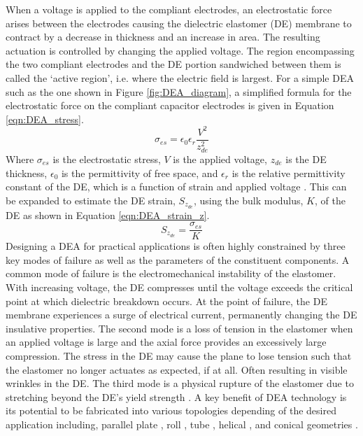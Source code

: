 When a voltage is applied to the compliant electrodes, an electrostatic force arises between the electrodes causing the dielectric elastomer (DE) membrane to contract by a decrease in thickness and an increase in area. The resulting actuation is controlled by changing the applied voltage. The region encompassing the two compliant electrodes and the DE portion sandwiched between them is called the `active region', i.e. where the electric field is largest. For a simple DEA such as the one shown in Figure \ref{fig:DEA_diagram}, a simplified formula for the electrostatic force on the compliant capacitor electrodes is given in Equation \ref{eqn:DEA_stress}.
\begin{equation}
	\sigma_{es} = \epsilon_0 \epsilon_r \frac{V^2}{z_{de}^2}
	\label{eqn:DEA_stress}
\end{equation}
Where $\sigma_{es}$ is the electrostatic stress, $V$ is the applied voltage, $z_{de}$ is the DE thickness, $\epsilon_0$ is the permittivity of free space, and $\epsilon_r$ is the relative permittivity constant of the DE, which is a function of strain \cite{Kofod2003, Choi2005, Wissler2007} and applied voltage \cite{Rosset2013} . This can be expanded to estimate the DE strain, $S_{z_{de}}$, using the bulk modulus, $K$, of the DE as shown in Equation \ref{eqn:DEA_strain_z}.
\begin{equation}
	S_{z_{de}} = \frac{\sigma_{es}}{K}
	\label{eqn:DEA_strain_z}
\end{equation}
Designing a DEA for practical applications is often highly constrained by three key modes of failure as well as the parameters of the constituent components. A common mode of failure is the electromechanical instability of the elastomer. With increasing voltage, the DE compresses until the voltage exceeds the critical point at which dielectric breakdown occurs. At the point of failure, the DE membrane experiences a surge of electrical current, permanently changing the DE insulative properties. The second mode is a loss of tension in the elastomer when an applied voltage is large and the axial force provides an excessively large compression. The stress in the DE may cause the plane to lose tension such that the elastomer no longer actuates as expected, if at all. Often resulting in visible wrinkles in the DE. The third mode is a physical rupture of the elastomer due to stretching beyond the DE's yield strength \cite{Mao2018} . A key benefit of DEA technology is its potential to be fabricated into various topologies depending of the desired application including, parallel plate \cite{Keplinger2012}, roll \cite{Zhao2018}, tube \cite{Thummala2012}, helical \cite{Kim2018}, and conical geometries \cite{Cao2018} .

